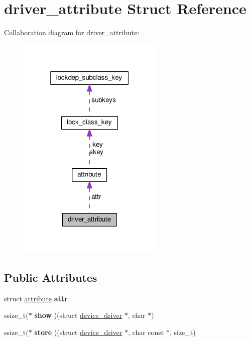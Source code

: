 \hypertarget{structdriver__attribute}{}\section{driver\+\_\+attribute Struct Reference}
\label{structdriver__attribute}


Collaboration diagram for driver\+\_\+attribute\+:
\nopagebreak
\begin{figure}[H]
\begin{center}
\leavevmode
\includegraphics[width=196pt]{structdriver__attribute__coll__graph}
\end{center}
\end{figure}
\subsection*{Public Attributes}
\begin{DoxyCompactItemize}
\item 
\hypertarget{structdriver__attribute_ab78b94f437c0fb30a9d3293f72eee8ab}{}struct \hyperlink{structattribute}{attribute} {\bfseries attr}\label{structdriver__attribute_ab78b94f437c0fb30a9d3293f72eee8ab}

\item 
\hypertarget{structdriver__attribute_a85ae3e206a15d8ddc504982d68c717fd}{}ssize\+\_\+t($\ast$ {\bfseries show} )(struct \hyperlink{structdevice__driver}{device\+\_\+driver} $\ast$, char $\ast$)\label{structdriver__attribute_a85ae3e206a15d8ddc504982d68c717fd}

\item 
\hypertarget{structdriver__attribute_a2706a00ba1358f613b32e11c6261bd80}{}ssize\+\_\+t($\ast$ {\bfseries store} )(struct \hyperlink{structdevice__driver}{device\+\_\+driver} $\ast$, char const $\ast$, size\+\_\+t)\label{structdriver__attribute_a2706a00ba1358f613b32e11c6261bd80}

\end{DoxyCompactItemize}


